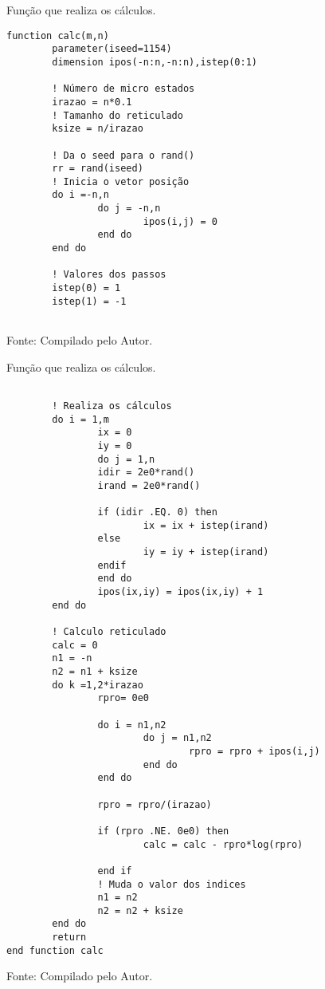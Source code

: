 \begin{figure}[h!]
\centering
\caption{Função que realiza os cálculos.}
\centering
\begin{lstlisting}
function calc(m,n)
        parameter(iseed=1154)
        dimension ipos(-n:n,-n:n),istep(0:1)
        
        ! Número de micro estados
        irazao = n*0.1
        ! Tamanho do reticulado
        ksize = n/irazao 

        ! Da o seed para o rand()
        rr = rand(iseed)
        ! Inicia o vetor posição
        do i =-n,n
                do j = -n,n
                        ipos(i,j) = 0
                end do
        end do
        
        ! Valores dos passos
        istep(0) = 1
        istep(1) = -1
        

\end{lstlisting}

\caption*{Fonte: Compilado pelo Autor.}
\label{fig:tarefa 4 - função que realiza os cálculos}
\end{figure}




\begin{figure}[h!]
\centering
\caption{Função que realiza os cálculos.}
\centering
\begin{lstlisting}

        ! Realiza os cálculos
        do i = 1,m
                ix = 0
                iy = 0
                do j = 1,n
                idir = 2e0*rand()
                irand = 2e0*rand()

                if (idir .EQ. 0) then
                        ix = ix + istep(irand)
                else
                        iy = iy + istep(irand)
                endif
                end do
                ipos(ix,iy) = ipos(ix,iy) + 1
        end do
        
        ! Calculo reticulado
        calc = 0
        n1 = -n
        n2 = n1 + ksize
        do k =1,2*irazao
                rpro= 0e0

                do i = n1,n2
                        do j = n1,n2
                                rpro = rpro + ipos(i,j) 
                        end do
                end do
                
                rpro = rpro/(irazao)
                
                if (rpro .NE. 0e0) then
                        calc = calc - rpro*log(rpro)

                end if
                ! Muda o valor dos indices
                n1 = n2
                n2 = n2 + ksize
        end do
        return
end function calc
\end{lstlisting}

\caption*{Fonte: Compilado pelo Autor.}
\label{fig:tarefa 4 - função que realiza os cálculos}
\end{figure}

